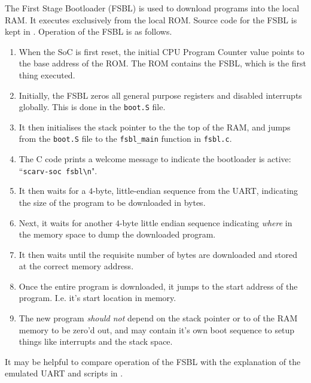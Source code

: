 
The First Stage Bootloader (FSBL) is used to download programs
into the local RAM.
It executes exclusively from the local ROM.
Source code for the FSBL is kept in
.
Operation of the FSBL is as follows.

\begin{enumerate}

\item When the SoC is first reset, the initial CPU Program Counter value
    points to the base address of the ROM.
    The ROM contains the FSBL, which is the first thing executed.

\item Initially, the FSBL zeros all general purpose registers and
    disabled interrupts globally.
    This is done in the {\tt boot.S} file.

\item It then initialises the stack pointer to the the top of the RAM,
    and jumps from the {\tt boot.S} file  to the {\tt fsbl\_main} function
    in {\tt fsbl.c}.

\item The C code prints a welcome message to indicate the bootloader is
    active: \\ ``{\tt scarv-soc fsbl\textbackslash n}".

\item It then waits for a $4$-byte, little-endian sequence from the
    UART, indicating the size of the program to be downloaded in bytes.

\item Next, it waits for another $4$-byte little endian sequence indicating
    {\em where} in the memory space to dump the downloaded program.

\item It then waits until the requisite number of bytes are downloaded
    and stored at the correct memory address.

\item Once the entire program is downloaded, it jumps to the start address
    of the program. I.e. it's start location in memory.

\item The new program {\em should not} depend on the stack pointer or
    to of the RAM memory to be zero'd out, and may contain it's
    own boot sequence to setup things like interrupts and the stack space.

\end{enumerate}

It may be helpful to compare operation of the FSBL with the explanation
of the emulated UART and  scripts
in .

